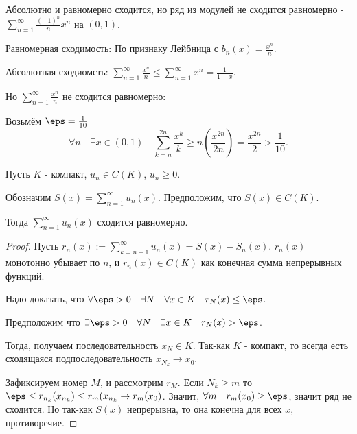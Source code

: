 \begin{example} \thmslashn

    Абсолютно и равномерно сходится, но ряд из модулей не сходится равномерно - $\sum\limits_{n=1}^{\infty} \frac{(-1)^{n}}{n}x^{n}$ на $(0, 1)$.

    Равномерная сходимость: По признаку Лейбница с $b_{n}(x) = \frac{x^{n}}{n}$.

    Абсолютная сходиомсть: $\sum\limits_{n=1}^{\infty} \frac{x^{n}}{n} \le \sum\limits_{n=1}^{\infty} x^{n} = \frac{1}{1-x}$.

    Но $\sum\limits_{n=1}^{\infty} \frac{x^{n}}{n}$ не сходится равномерно:

    Возьмём $\eps=\frac{1}{10}$
    \[ \forall{n}\quad \exists{x  \in (0, 1)}\quad \sum\limits_{k=n}^{2n} \frac{x^{k}}{k} \ge n\left( \frac{x^{2n}}{2n} \right) = \frac{x^{2n}}{2} > \frac{1}{10}  .\] 
\end{example}
\begin{theorem} \thmslashn

    Пусть $K$ - компакт, $u_{n}\in C(K)$, $u_{n} \ge 0$.

    Обозначим $S(x) = \sum\limits_{n=1}^{\infty} u_{n}(x)$. Предположим, что $S(x)\in C(K)$.

    Тогда $\sum\limits_{n=1}^{\infty} u_{n}(x)$ сходится равномерно.
    \begin{proof} \thmslashn
    
        Пусть $r_{n}(x) := \sum\limits_{k=n+1}^{\infty} u_{n}(x) = S(x) - S_{n}(x)$. $r_{n}(x)$ монотонно убывает по $n$, и $r_{n}(x)\in C(K)$ как конечная сумма непрерывных функций.

        Надо доказать, что $\forall{\eps > 0}\quad \exists{N}\quad \forall{x\in K}\quad r_{N}(x) \le  \eps $.

        Предположим что $\exists{\eps > 0}\quad \forall{N}\quad \exists{x\in K}\quad r_{N}(x) > \eps$.

        Тогда, получаем последовательность $x_{N}\in K$. Так-как $K$ - компакт, то всегда есть сходящаяся подпоследовательность $x_{N_{k}} \to x_0$.

        Зафиксируем номер $M$, и рассмотрим $r_{M}$. Если $N_{k} \ge m$ то $\eps \le r_{n_{k}}(x_{n_{k}}) \le r_{m}(x_{n_{k}} \to r_{m}(x_0)$. Значит, $\forall{m}\quad r_{m}(x_0) \ge \eps$, значит ряд не сходится. Но так-как $S(x)$ непрерывна, то она конечна для всех $x$, противоречие.
    \end{proof}
\end{theorem}
